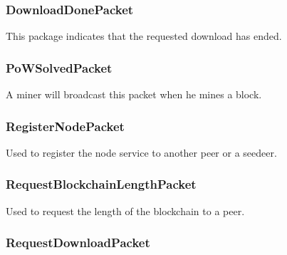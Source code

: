\documentclass[../documentation.tex]{subfiles}
\begin{document}
\newcommand{\packettabularnoid}[1]{
    \bgroup{}
    \def\arraystretch{1.25}
    \begin{center}
        \begin{tabular}{|l|l|l|}
            \hline
            \textbf{Name} & \textbf{Type} & \textbf{Descritpion}
            \tline

            \if\relax\detokenize{#1}\relax
            \else
                #1
                \tline
            \fi
        \end{tabular}
    \end{center}
    \egroup{}
}

\subsubsection{DownloadDonePacket}

This package indicates that the requested download has ended.

\packettabular{}

\subsubsection{PoWSolvedPacket}

A miner will broadcast this packet when he mines a block.


\subsubsection{RegisterNodePacket}

Used to register the node service to another peer or a seedeer.


\subsubsection{RequestBlockchainLengthPacket}

Used to request the length of the blockchain to a peer.

\packettabular{}

\subsubsection{RequestDownloadPacket}
\end{document}
